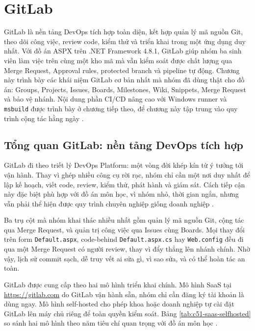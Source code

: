 \section{GitLab}
\label{sec:c51-gitlab}

GitLab là nền tảng DevOps tích hợp toàn diện, kết hợp quản lý mã nguồn Git,
theo dõi công việc, review code, kiểm thử và triển khai trong một ứng dụng duy nhất.
Với đồ án ASPX trên .NET Framework 4.8.1, GitLab giúp nhóm ba sinh viên làm việc
trên cùng một kho mã mà vẫn kiểm soát được chất lượng qua Merge Request,
Approval rules, protected branch và pipeline tự động.
Chương này trình bày các khái niệm GitLab cơ bản nhất mà nhóm đã dùng thật cho đồ án:
Groups, Projects, Issues, Boards, Milestones, Wiki, Snippets, Merge Request và bảo vệ nhánh.
Nội dung phần CI/CD nâng cao với Windows runner và \texttt{msbuild} được trình bày ở chương tiếp theo,
để chương này tập trung vào quy trình cộng tác hằng ngày \cite{gitlabdocs}.

\subsection{Tổng quan GitLab: nền tảng DevOps tích hợp}
\label{subsec:c51-tong-quan}

GitLab đi theo triết lý DevOps Platform: một vòng đời khép kín từ ý tưởng tới vận hành.
Thay vì ghép nhiều công cụ rời rạc, nhóm chỉ cần một nơi duy nhất để lập kế hoạch,
viết code, review, kiểm thử, phát hành và giám sát.
Cách tiếp cận này đặc biệt phù hợp với đồ án môn học, vì nhóm nhỏ, thời gian ngắn,
nhưng vẫn phải thể hiện được quy trình chuyên nghiệp giống doanh nghiệp \cite{gitlabdocs}.

Ba trụ cột mà nhóm khai thác nhiều nhất gồm quản lý mã nguồn Git, cộng tác qua Merge Request,
và quản trị công việc qua Issues cùng Boards.
Mọi thay đổi trên form \texttt{Default.aspx}, code-behind \texttt{Default.aspx.cs} hay
\texttt{Web.config} đều đi qua một Merge Request có người review, thay vì đẩy thẳng lên nhánh chính.
Nhờ vậy, lịch sử commit sạch, dễ truy vết ai sửa gì, vì sao sửa, và có thể hoàn tác an toàn.

GitLab được cung cấp theo hai mô hình triển khai chính.
Mô hình SaaS tại \url{https://gitlab.com} do GitLab vận hành sẵn, nhóm chỉ cần đăng ký tài khoản là dùng ngay.
Mô hình self-hosted cho phép khoa hoặc doanh nghiệp tự cài đặt GitLab lên máy chủ riêng để toàn quyền kiểm soát.
Bảng \ref{tab:c51-saas-selfhosted} so sánh hai mô hình theo năm tiêu chí quan trọng với đồ án môn học \cite{gitlabdocs}.

